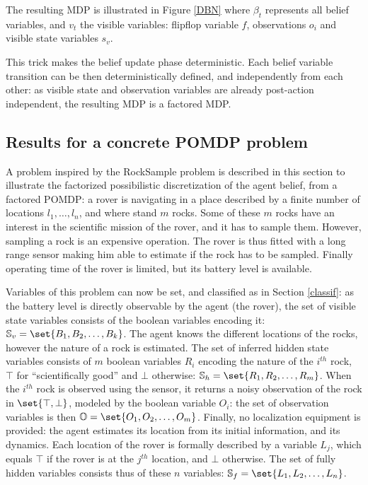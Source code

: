 The resulting MDP is illustrated in Figure \ref{DBN} where $\beta_t$ represents all belief variables,
and $v_t$ the visible variables: flipflop variable $f$, observations $o_i$ and visible state variables $s_v$.

This trick makes the belief update phase deterministic. Each belief variable
transition can be then deterministically defined, and independently from
each other: as visible state and observation variables are already post-action independent, 
the resulting MDP is a factored MDP.
\subsection{Results for a concrete POMDP problem}
A problem inspired by the RockSample problem \cite{Smith:2004:HSV:1036843.1036906} is described in this section
to illustrate the factorized possibilistic discretization of the agent belief, from a factored POMDP:
a rover is navigating in a place described by a finite number of locations $l_1, \ldots, l_n$,
and where stand $m$ rocks. Some of these $m$ rocks have an interest in the scientific
mission of the rover, and it has to sample them. However, sampling a rock is an expensive
operation. The rover is thus fitted with a long range sensor making him able to estimate if
the rock has to be sampled. Finally operating time of the rover is limited, but its battery
level is available.

Variables of this problem can now be set, and classified as in Section \ref{classif}:
as the battery level is directly observable by the agent (the rover), the set of
visible state variables consists of the boolean variables encoding it: $\mathbb{S}_v = \set{B_1, B_2, \ldots, B_k}$.
The agent knows the different locations of the rocks, however the nature of a rock is estimated.
The set of inferred hidden state variables consists of $m$ boolean variables $R_i$ encoding the nature
of the $i^{th}$ rock, $\top$ for ``scientifically good'' and $\bot$ otherwise: 
$\mathbb{S}_h = \set{R_1, R_2, \ldots, R_m}$. When the $i^{th}$ rock is observed using the sensor, it returns a noisy 
observation of the rock in $\set{\top,\bot}$, modeled by the boolean variable $O_i$: the set of observation
variables is then $\mathbb{O} = \set{O_1, O_2, \ldots, O_m}$.
Finally, no localization equipment is provided: the agent estimates its location from its initial information,
and its dynamics. Each location of the rover is formally described by a variable $L_j$, which equals $\top$
if the rover is at the $j^{th}$ location, and $\bot$ otherwise. The set of fully hidden variables consists thus
of these $n$ variables: $\mathbb{S}_f = \set{L_1, L_2, \ldots, L_{n}}$. 

